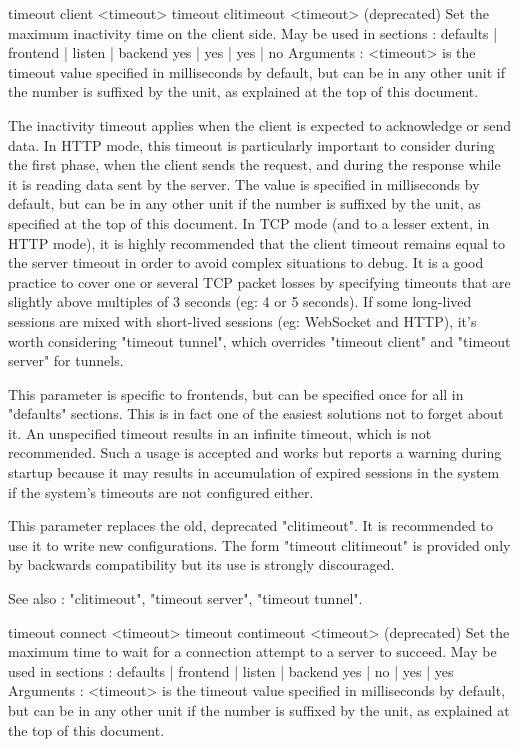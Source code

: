 timeout client <timeout>
timeout clitimeout <timeout> (deprecated)
  Set the maximum inactivity time on the client side.
  May be used in sections :   defaults | frontend | listen | backend
                                 yes   |    yes   |   yes  |   no
  Arguments :
    <timeout> is the timeout value specified in milliseconds by default, but
              can be in any other unit if the number is suffixed by the unit,
              as explained at the top of this document.

  The inactivity timeout applies when the client is expected to acknowledge or
  send data. In HTTP mode, this timeout is particularly important to consider
  during the first phase, when the client sends the request, and during the
  response while it is reading data sent by the server. The value is specified
  in milliseconds by default, but can be in any other unit if the number is
  suffixed by the unit, as specified at the top of this document. In TCP mode
  (and to a lesser extent, in HTTP mode), it is highly recommended that the
  client timeout remains equal to the server timeout in order to avoid complex
  situations to debug. It is a good practice to cover one or several TCP packet
  losses by specifying timeouts that are slightly above multiples of 3 seconds
  (eg: 4 or 5 seconds). If some long-lived sessions are mixed with short-lived
  sessions (eg: WebSocket and HTTP), it's worth considering "timeout tunnel",
  which overrides "timeout client" and "timeout server" for tunnels.

  This parameter is specific to frontends, but can be specified once for all in
  "defaults" sections. This is in fact one of the easiest solutions not to
  forget about it. An unspecified timeout results in an infinite timeout, which
  is not recommended. Such a usage is accepted and works but reports a warning
  during startup because it may results in accumulation of expired sessions in
  the system if the system's timeouts are not configured either.

  This parameter replaces the old, deprecated "clitimeout". It is recommended
  to use it to write new configurations. The form "timeout clitimeout" is
  provided only by backwards compatibility but its use is strongly discouraged.

  See also : "clitimeout", "timeout server", "timeout tunnel".


timeout connect <timeout>
timeout contimeout <timeout> (deprecated)
  Set the maximum time to wait for a connection attempt to a server to succeed.
  May be used in sections :   defaults | frontend | listen | backend
                                 yes   |    no    |   yes  |   yes
  Arguments :
    <timeout> is the timeout value specified in milliseconds by default, but
              can be in any other unit if the number is suffixed by the unit,
              as explained at the top of this document.

